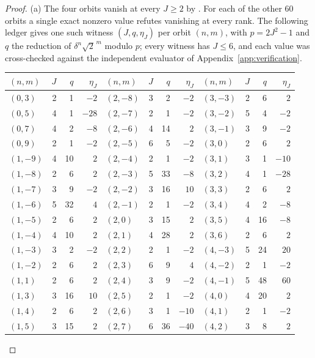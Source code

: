 \documentclass[11pt]{article}
\theoremstyle{definition}
\begin{document}
\begin{proof}
(a) The four orbits vanish at every $J\geq2$ by
\cite[Thm.~7.1]{MahmoodP1Collection2026}.  For each of the other $60$
orbits a single exact nonzero value refutes vanishing at every rank.
The following ledger gives one such witness $(J,q,\eta_J)$ per orbit
$(n,m)$, with $p=2J^2-1$ and $q$ the reduction of $\delta^n\sqrt2^{\,m}$
modulo $p$; every witness has $J\leq6$, and each value was cross-checked
against the independent evaluator of Appendix~\ref{app:verification}.
\begin{center}
\small
\begin{tabular}{@{}lrrr@{\qquad}lrrr@{\qquad}lrrr@{}}
\toprule
$(n,m)$ & $J$ & $q$ & $\eta_J$ & $(n,m)$ & $J$ & $q$ & $\eta_J$ & $(n,m)$ & $J$ & $q$ & $\eta_J$\\
\midrule
$(0,3)$ & 2 & 1 & $-2$ & $(2,-8)$ & 3 & 2 & $-2$ & $(3,-3)$ & 2 & 6 & $2$\\
$(0,5)$ & 4 & 1 & $-28$ & $(2,-7)$ & 2 & 1 & $-2$ & $(3,-2)$ & 5 & 4 & $-2$\\
$(0,7)$ & 4 & 2 & $-8$ & $(2,-6)$ & 4 & 14 & $2$ & $(3,-1)$ & 3 & 9 & $-2$\\
$(0,9)$ & 2 & 1 & $-2$ & $(2,-5)$ & 6 & 5 & $-2$ & $(3,0)$ & 2 & 6 & $2$\\
$(1,-9)$ & 4 & 10 & $2$ & $(2,-4)$ & 2 & 1 & $-2$ & $(3,1)$ & 3 & 1 & $-10$\\
$(1,-8)$ & 2 & 6 & $2$ & $(2,-3)$ & 5 & 33 & $-8$ & $(3,2)$ & 4 & 1 & $-28$\\
$(1,-7)$ & 3 & 9 & $-2$ & $(2,-2)$ & 3 & 16 & $10$ & $(3,3)$ & 2 & 6 & $2$\\
$(1,-6)$ & 5 & 32 & $4$ & $(2,-1)$ & 2 & 1 & $-2$ & $(3,4)$ & 4 & 2 & $-8$\\
$(1,-5)$ & 2 & 6 & $2$ & $(2,0)$ & 3 & 15 & $2$ & $(3,5)$ & 4 & 16 & $-8$\\
$(1,-4)$ & 4 & 10 & $2$ & $(2,1)$ & 4 & 28 & $2$ & $(3,6)$ & 2 & 6 & $2$\\
$(1,-3)$ & 3 & 2 & $-2$ & $(2,2)$ & 2 & 1 & $-2$ & $(4,-3)$ & 5 & 24 & $20$\\
$(1,-2)$ & 2 & 6 & $2$ & $(2,3)$ & 6 & 9 & $4$ & $(4,-2)$ & 2 & 1 & $-2$\\
$(1,1)$ & 2 & 6 & $2$ & $(2,4)$ & 3 & 9 & $-2$ & $(4,-1)$ & 5 & 48 & $60$\\
$(1,3)$ & 3 & 16 & $10$ & $(2,5)$ & 2 & 1 & $-2$ & $(4,0)$ & 4 & 20 & $2$\\
$(1,4)$ & 2 & 6 & $2$ & $(2,6)$ & 3 & 1 & $-10$ & $(4,1)$ & 2 & 1 & $-2$\\
$(1,5)$ & 3 & 15 & $2$ & $(2,7)$ & 6 & 36 & $-40$ & $(4,2)$ & 3 & 8 & $2$\\

\end{tabular}
\end{center}
\end{proof}
\end{document}

